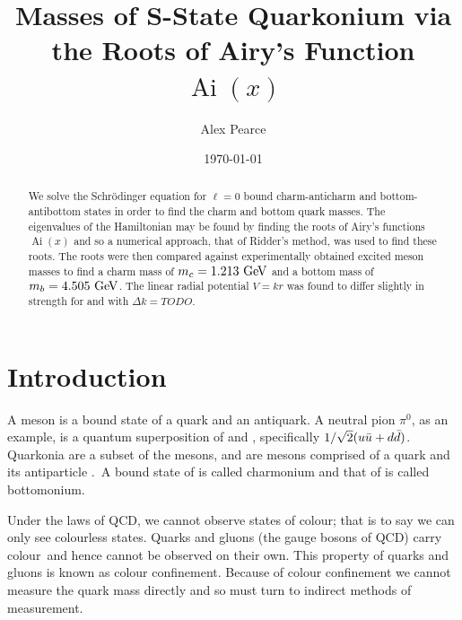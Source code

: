 \documentclass[]{article}
\newcommand{\Ai}[1]{\ensuremath{\operatorname{Ai}({#1})}}
\begin{document}
\title{Masses of S-State Quarkonium via the Roots of Airy's Function $\Ai{x}$}
\author{Alex Pearce}
\date{\today}
\maketitle


\begin{abstract}
We solve the Schr\"{o}dinger equation for $\ell = 0$ bound charm-anticharm \ccbar and bottom-antibottom \bbbar states in order to find the charm and bottom quark masses. The eigenvalues of the Hamiltonian may be found by finding the roots of Airy's functions $\Ai{x}$ and so a numerical approach, that of Ridder's method, was used to find these roots. The roots were then compared against experimentally obtained excited meson masses to find a charm mass of $m_{c} = 1.213\GeV$ and a bottom mass of $m_{b} = 4.505\GeV$. The linear radial potential $V = kr$ was found to differ slightly in strength for \ccbar and \bbbar with $\Delta k = TODO$.
\end{abstract}


\section{Introduction}\label{sec:intro}

A meson is a bound state of a quark and an antiquark. A neutral pion $\pi^{0}$, as an example, is a quantum superposition of \uubar and \ddbar, specifically $1/\sqrt{2}(u\bar{u} + d\bar{d})$. Quarkonia are a subset of the mesons, and are mesons comprised of a quark and its antiparticle \qqbar.\footnotemark\ A bound state of \ccbar is called charmonium and that of \bbbar is called bottomonium.


Under the laws of QCD, we cannot observe states of colour; that is to say we can only see colourless states. Quarks and gluons (the gauge bosons of QCD) carry colour\footnotemark\ and hence cannot be observed on their own. This property of quarks and gluons is known as colour confinement. Because of colour confinement we cannot measure the quark mass directly and so must turn to indirect methods of measurement.

\end{document}
